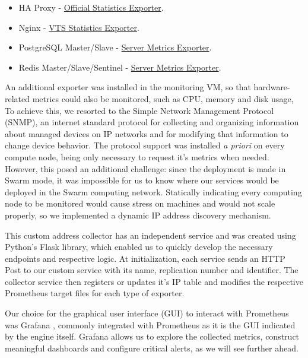 \documentclass[12pt]{article}
\begin{document}
\vspace{-10pt}
\begin{itemize} [noitemsep]
  \item HA Proxy - \href{https://github.com/prometheus/haproxy_exporter}{Official Statistics Exporter}.
  \item Nginx - \href{https://github.com/hnlq715/nginx-vts-exporter}{VTS Statistics Exporter}.
  \item PostgreSQL Master/Slave - \href{https://github.com/wrouesnel/postgres_exporter}{Server Metrics Exporter}.
  \item Redis Master/Slave/Sentinel - \href{https://github.com/oliver006/redis_exporter}{Server Metrics Exporter}.
\end{itemize}
\vspace{-10pt}

An additional exporter was installed in the monitoring VM, so that hardware-related metrics could also be monitored, such as CPU, memory and disk usage,
To achieve this, we resorted to the Simple Network Management Protocol (SNMP), an internet standard protocol for collecting and organizing information about
managed devices on IP networks and for modifying that information to change device behavior.
The protocol support was installed \textit{a priori} on every compute node, being only necessary to request it's metrics when needed.
However, this posed an additional challenge: since the deployment is made in Swarm mode, it was impossible for us to know where our services would be deployed
in the Swarm computing network.
Statically indicating every computing node to be monitored would cause stress on machines and would not scale properly, so we implemented a dynamic IP address
discovery mechanism.

This custom address collector has an independent service and was created using Python's Flask library, which enabled us to quickly develop the necessary endpoints
and respective logic.
At initialization, each service sends an HTTP Post to our custom service with its name, replication number and identifier.
The collector service then registers or updates it's IP table and modifies the respective Prometheus target files for each type of exporter.

Our choice for the graphical user interface (GUI) to interact with Prometheus was Grafana \cite{grafana}, commonly integrated with Prometheus as it is the GUI
indicated by the engine itself.
Grafana allows us to explore the collected metrics, construct meaningful dashboards and configure critical alerts, as we will see further ahead.
\end{document}
